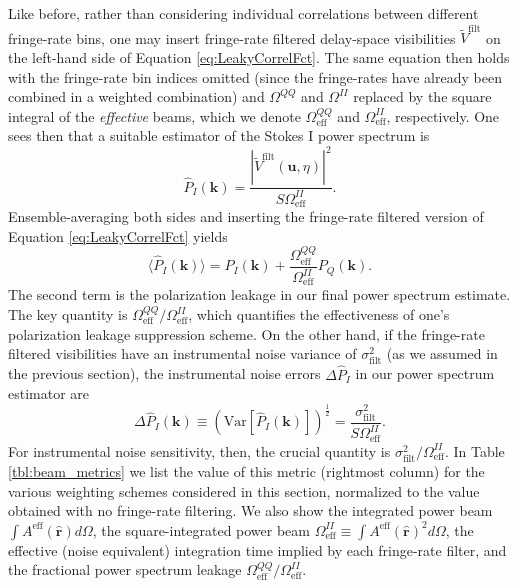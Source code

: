 \documentclass[twocolumn,apj,numberedappendix]{emulateapj}
\newcommand{\rhat}{\hat{\mathbf{r}}}
\begin{document}
Like before, rather than considering individual correlations between different fringe-rate bins, one may
insert fringe-rate filtered delay-space visibilities $\widetilde{V}^\textrm{filt} $ on the left-hand side of Equation \eqref{eq:LeakyCorrelFct}. The
same equation then holds with the fringe-rate bin indices omitted (since the fringe-rates have already
been combined in a weighted combination) and $\Omega^{QQ}$ and $\Omega^{II}$ replaced
by the square integral of the \emph{effective} beams, which we denote $\Omega^{QQ}_\textrm{eff}$ and $\Omega^{II}_\textrm{eff}$, respectively. One sees then that a suitable estimator of
the Stokes I power spectrum is
\begin{equation}
\widehat{P}_I (\mathbf{k}) =\frac{ | \widetilde{V}^\textrm{filt} (\mathbf{u}, \eta) |^2}{S \Omega^{II}_\textrm{eff}}.
\end{equation}
Ensemble-averaging both sides and inserting the fringe-rate filtered version of Equation \eqref{eq:LeakyCorrelFct} yields
\begin{equation}
\langle \widehat{P}_I (\mathbf{k}) \rangle = P_I (\mathbf{k}) + \frac{\Omega^{QQ}_\textrm{eff}}{\Omega^{II}_\textrm{eff}} P_Q (\mathbf{k}).
\end{equation}
The second term is the polarization leakage in our final power spectrum estimate. The key quantity is $\Omega^{QQ}_\textrm{eff}/\Omega^{II}_\textrm{eff}$, which quantifies the effectiveness of
one's polarization leakage suppression scheme. On the other hand, if the fringe-rate filtered
visibilities have an instrumental noise variance of $\sigma^2_\textrm{filt}$ (as we assumed in the previous section),
the instrumental noise errors $\Delta \widehat{P}_I$ in our power spectrum estimator are
\begin{equation}
\Delta \widehat{P}_I (\mathbf{k}) \equiv \left(\textrm{Var} \left[\widehat{P}_I (\mathbf{k}) \right]\right)^\frac{1}{2} = \frac{\sigma^2_\textrm{filt}}{S\Omega^{II}_\textrm{eff}}.
\end{equation}
For instrumental noise sensitivity, then, the crucial quantity is $\sigma^2_\textrm{filt} / \Omega^{II}_\textrm{eff}$. In Table \ref{tbl:beam_metrics} we list the value of this metric
(rightmost column) for the various weighting schemes considered in this section, normalized to the value
obtained with no fringe-rate filtering. We also show the integrated power beam $\int A^\textrm{eff} (\rhat) d\Omega$, the
square-integrated power beam $\Omega^{II}_\textrm{eff} \equiv \int A^\textrm{eff} (\rhat)^2 d\Omega$, the
effective (noise equivalent) integration time implied by each fringe-rate filter, and the fractional power spectrum
leakage $\Omega^{QQ}_\textrm{eff}/\Omega^{II}_\textrm{eff}$.
\end{document}
